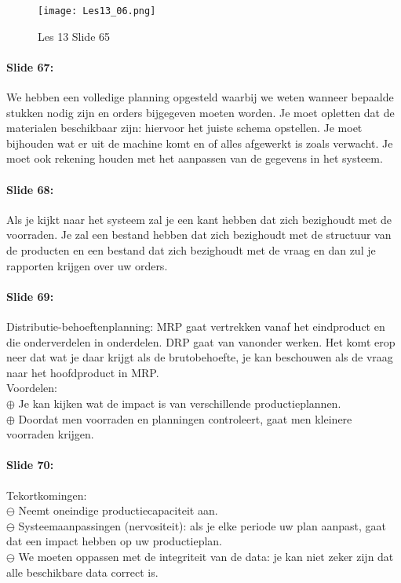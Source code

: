 \documentclass[10pt,a4paper]{report}
\begin{document}
\begin{figure}[h!]
\centering
\texttt{[image: Les13\_06.png]}
\caption{Les 13 Slide 65} 
\label{les13_06}
\end{figure}

\paragraph{Slide 67:} We hebben een volledige planning opgesteld waarbij we weten wanneer bepaalde stukken nodig zijn en orders bijgegeven moeten worden. Je moet opletten dat de materialen beschikbaar zijn: hiervoor het juiste schema opstellen. Je moet bijhouden wat er uit de machine komt en of alles afgewerkt is zoals verwacht. Je moet ook rekening houden met het aanpassen van de gegevens in het systeem.

\paragraph{Slide 68:} Als je kijkt naar het systeem zal je een kant hebben dat zich bezighoudt met de voorraden. Je zal een bestand hebben dat zich bezighoudt met de structuur van de producten en een bestand dat zich bezighoudt met de vraag en dan zul je rapporten krijgen over uw orders.

\paragraph{Slide 69:} Distributie-behoeftenplanning: MRP gaat vertrekken vanaf het eindproduct en die onderverdelen in onderdelen. DRP gaat van vanonder werken. Het komt erop neer dat wat je daar krijgt als de brutobehoefte, je kan beschouwen als de vraag naar het hoofdproduct in MRP.\\
Voordelen:\\
$\oplus$ Je kan kijken wat de impact is van verschillende productieplannen.\\
$\oplus$ Doordat men voorraden en planningen controleert, gaat men kleinere voorraden krijgen.

\paragraph{Slide 70:} Tekortkomingen:\\
$\ominus$ Neemt oneindige productiecapaciteit aan.\\
$\ominus$ Systeemaanpassingen (nervositeit): als je elke periode uw plan aanpast, gaat dat een impact hebben op uw productieplan. \\
$\ominus$ We moeten oppassen met de integriteit van de data: je kan niet zeker zijn dat alle beschikbare data correct is.
\end{document}
